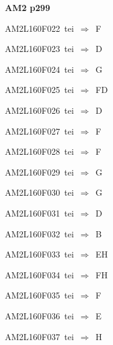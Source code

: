 \par\vfill\eject
{\bf\hfill AM2 p299\hfill\hbox{}}\par\bigskip
{\sixrm AM2L160F022\ {\sixit tei}\ }$\Rightarrow$\ F\par\smallskip
{\sixrm AM2L160F023\ {\sixit tei}\ }$\Rightarrow$\ D\par\smallskip
{\sixrm AM2L160F024\ {\sixit tei}\ }$\Rightarrow$\ G\par\smallskip
{\sixrm AM2L160F025\ {\sixit tei}\ }$\Rightarrow$\ FD\par\smallskip
{\sixrm AM2L160F026\ {\sixit tei}\ }$\Rightarrow$\ D\par\smallskip
{\sixrm AM2L160F027\ {\sixit tei}\ }$\Rightarrow$\ F\par\smallskip
{\sixrm AM2L160F028\ {\sixit tei}\ }$\Rightarrow$\ F\par\smallskip
{\sixrm AM2L160F029\ {\sixit tei}\ }$\Rightarrow$\ G\par\smallskip
{\sixrm AM2L160F030\ {\sixit tei}\ }$\Rightarrow$\ G\par\smallskip
{\sixrm AM2L160F031\ {\sixit tei}\ }$\Rightarrow$\ D\par\smallskip
{\sixrm AM2L160F032\ {\sixit tei}\ }$\Rightarrow$\ B\par\smallskip
{\sixrm AM2L160F033\ {\sixit tei}\ }$\Rightarrow$\ EH\par\smallskip
{\sixrm AM2L160F034\ {\sixit tei}\ }$\Rightarrow$\ FH\par\smallskip
{\sixrm AM2L160F035\ {\sixit tei}\ }$\Rightarrow$\ F\par\smallskip
{\sixrm AM2L160F036\ {\sixit tei}\ }$\Rightarrow$\ E\par\smallskip
{\sixrm AM2L160F037\ {\sixit tei}\ }$\Rightarrow$\ H\par\smallskip


